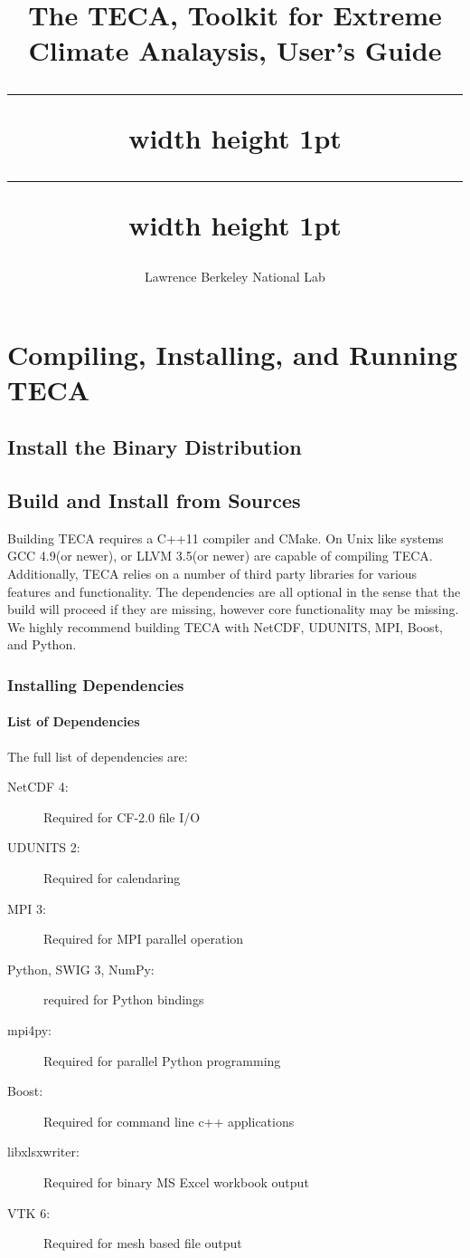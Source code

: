 \documentclass[a4paper,10pt,DIV=12]{scrreprt}
\title{%
The TECA, Toolkit for Extreme Climate Analaysis, User's Guide \\ \vspace{3mm} %
\hrule width \hsize height 1pt \vspace{0.51mm} %
\hrule width \hsize height 1pt}
\subtitle{Lawrence Berkeley National Lab}
\author{}
\begin{document}
\maketitle


\tableofcontents

\chapter{Compiling, Installing, and Running TECA}
\section{Install the Binary Distribution}

\section{Build and Install from Sources}
\label{sec:build}
Building TECA requires a C++11 compiler and CMake. On Unix like systems
GCC 4.9(or newer), or LLVM 3.5(or newer) are capable of compiling TECA.
Additionally, TECA relies on a number of third party libraries for various
features and functionality. The dependencies are all optional in the sense
that the build will proceed if they are missing, however core functionality
may be missing. We highly recommend building TECA with NetCDF, UDUNITS,
MPI, Boost, and Python.



\subsection{Installing Dependencies}
\subsubsection{List of Dependencies}
The full list of dependencies are:

\vspace{2mm}\hspace{0.2in}\begin{minipage}{0.8\textwidth}
\begin{description}
 \item[NetCDF 4:] Required for CF-2.0 file I/O
 \item[UDUNITS 2:] Required for calendaring
 \item[MPI 3:] Required for MPI parallel operation
 \item [Python, SWIG 3, NumPy:] required for Python bindings
 \item [mpi4py:] Required for parallel Python programming
 \item[Boost:] Required for command line c++ applications
 \item [libxlsxwriter:] Required for binary MS Excel workbook output
 \item [VTK 6:] Required for mesh based file output
\end{description}
\end{minipage}\vspace{2mm}
\end{document}
